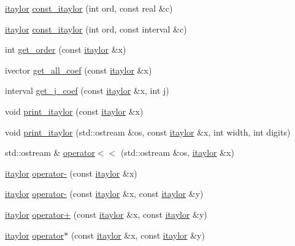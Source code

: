 \begin{DoxyCompactItemize}
\item 
\hyperlink{classtaylor_1_1itaylor}{itaylor} \hyperlink{namespacetaylor_a08f702327849871fe51880e06ca9d597}{const\-\_\-itaylor} (int ord, const real \&c)
\item 
\hyperlink{classtaylor_1_1itaylor}{itaylor} \hyperlink{namespacetaylor_a181e11b88a03a4851d44b5cfd6adbd78}{const\-\_\-itaylor} (int ord, const interval \&c)
\item 
int \hyperlink{namespacetaylor_abdd8de17279023fa411c8c69dbce60df}{get\-\_\-order} (const \hyperlink{classtaylor_1_1itaylor}{itaylor} \&x)
\item 
ivector \hyperlink{namespacetaylor_a50419e8b461f8b4155495d943cbc4469}{get\-\_\-all\-\_\-coef} (const \hyperlink{classtaylor_1_1itaylor}{itaylor} \&x)
\item 
interval \hyperlink{namespacetaylor_a6694e32c6d5d68b7081fe4079435279e}{get\-\_\-j\-\_\-coef} (const \hyperlink{classtaylor_1_1itaylor}{itaylor} \&x, int j)
\item 
void \hyperlink{namespacetaylor_ac75b67e2f3d78871403f431867807ee0}{print\-\_\-itaylor} (const \hyperlink{classtaylor_1_1itaylor}{itaylor} \&x)
\item 
void \hyperlink{namespacetaylor_a48b8404764aa49f337985ba478f4e201}{print\-\_\-itaylor} (std\-::ostream \&os, const \hyperlink{classtaylor_1_1itaylor}{itaylor} \&x, int width, int digits)
\item 
std\-::ostream \& \hyperlink{namespacetaylor_af2f42b7045a6bc7bdf5225bb5b7f07bc}{operator$<$$<$} (std\-::ostream \&os, \hyperlink{classtaylor_1_1itaylor}{itaylor} \&x)
\item 
\hyperlink{classtaylor_1_1itaylor}{itaylor} \hyperlink{namespacetaylor_a92d08c093471e48086af561e044283d2}{operator-\/} (const \hyperlink{classtaylor_1_1itaylor}{itaylor} \&x)
\item 
\hyperlink{classtaylor_1_1itaylor}{itaylor} \hyperlink{namespacetaylor_a3a700687e786e96af9fb63575f941188}{operator-\/} (const \hyperlink{classtaylor_1_1itaylor}{itaylor} \&x, const \hyperlink{classtaylor_1_1itaylor}{itaylor} \&y)
\item 
\hyperlink{classtaylor_1_1itaylor}{itaylor} \hyperlink{namespacetaylor_a02e03dd1f37b791466c6ceaff7dadb36}{operator+} (const \hyperlink{classtaylor_1_1itaylor}{itaylor} \&x, const \hyperlink{classtaylor_1_1itaylor}{itaylor} \&y)
\item 
\hyperlink{classtaylor_1_1itaylor}{itaylor} \hyperlink{namespacetaylor_a67bd05fe808051b2bd312fb3f488d448}{operator$\ast$} (const \hyperlink{classtaylor_1_1itaylor}{itaylor} \&x, const \hyperlink{classtaylor_1_1itaylor}{itaylor} \&y)

\end{DoxyCompactItemize}
